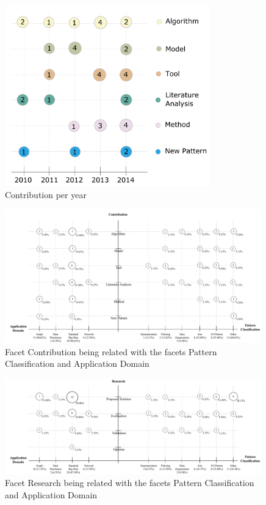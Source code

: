 

\begin{figure}[hbtp]
\centering
\includegraphics[width=0.79\textwidth]{figs/ContributionPerYear.pdf}
\caption{Contribution per year}
\label{fig:contribution-per-year}
\end{figure}

\begin{figure}[hbtp]
\centering
\includegraphics[width=0.99\textwidth]{figs/Contribution-Patterns-Domain.pdf}
\caption{Facet Contribution being related with the facets Pattern
Classification and Application Domain}
\label{fig:contribution-patterns-domain}
\end{figure}

\begin{figure}[hbtp]
\centering
\includegraphics[width=0.99\textwidth]{figs/Research-Patterns-Domain.pdf}
\caption{Facet Research being related with the facets Pattern
Classification and Application Domain}
\label{fig:research-patterns-domain}
\end{figure}

